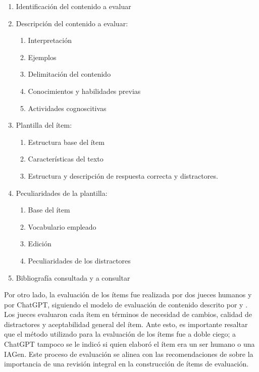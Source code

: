 \begin{enumerate}
	\def\labelenumi{\arabic{enumi}.}
	\item
	Identificación del contenido a evaluar
	\item
	Descripción del contenido a evaluar:
	
	\begin{enumerate}
		\def\labelenumii{\alph{enumii}.}
		\item
		Interpretación
		\item
		Ejemplos
		\item
		Delimitación del contenido
		\item
		Conocimientos y habilidades previas
		\item
		Actividades cognoscitivas
	\end{enumerate}
	\item
	Plantilla del ítem:
	
	\begin{enumerate}
		\def\labelenumii{\alph{enumii}.}
		\item
		Estructura base del ítem
		\item
		Características del texto
		\item
		Estructura y descripción de respuesta correcta y distractores.
	\end{enumerate}
	\item
	Peculiaridades de la plantilla:
	
	\begin{enumerate}
		\def\labelenumii{\alph{enumii}.}
		\item
		Base del ítem
		\item
		Vocabulario empleado
		\item
		Edición
		\item
		Peculiaridades de los distractores
	\end{enumerate}
	\item
	Bibliografía consultada y a consultar
\end{enumerate}

Por otro lado, la evaluación de los ítems fue realizada por dos jueces
humanos y por ChatGPT, siguiendo el modelo de evaluación de contenido
descrito por \textcite{Haladyna2004} y \textcite{Lynn1986}. Los jueces evaluaron cada
ítem en términos de necesidad de cambios, calidad de distractores y
aceptabilidad general del ítem. Ante esto, es importante resaltar que el
método utilizado para la evaluación de los ítems fue a doble ciego; a
ChatGPT tampoco se le indicó si quien elaboró el ítem era un ser humano
o una IAGen. Este proceso de evaluación se alinea con las
recomendaciones de \textcite{Nitko2011} sobre la importancia de una
revisión integral en la construcción de ítems de evaluación.

